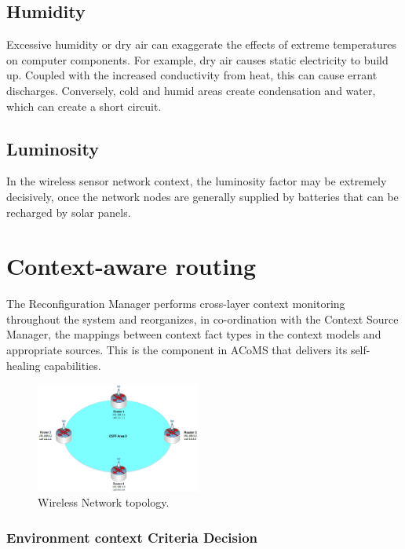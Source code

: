 \documentclass[conference]{IEEEtran}
\begin{document}
\subsection{Humidity}
Excessive humidity or dry air can exaggerate the effects of extreme temperatures on computer components. For example, dry air causes static electricity to build up. Coupled with the increased conductivity from heat, this can cause errant discharges. Conversely, cold and humid areas create condensation and water, which can create a short circuit.

\subsection{Luminosity}
In the wireless sensor network context, the luminosity factor may be extremely decisively, once the network nodes are generally supplied by batteries that can be recharged by solar panels.

\section{Context-aware routing}
The Reconfiguration Manager performs cross-layer context monitoring throughout the system and reorganizes, in co-ordination with the Context Source Manager, the mappings between context fact types in the context models and appropriate sources. This is the component in ACoMS that delivers its self-healing capabilities.

\begin{figure}[h]
\centering
\includegraphics[width=0.48\textwidth]{figs/topology.eps}
\caption{Wireless Network topology.}
\label{Fig01}
\end{figure}



\subsubsection{Environment context Criteria Decision}
\end{document}
